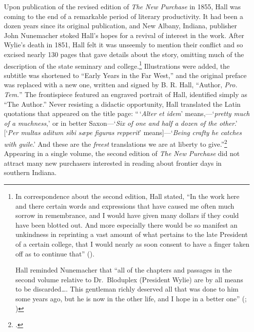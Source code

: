 \documentclass[
  american,
  letterpaper,
]{scrreprt}
\begin{document}
Upon publication of the revised edition of \emph{The New Purchase} in
1855, Hall was coming to the end of a remarkable period of literary
productivity. It had been a dozen years since its original publication,
and New Albany, Indiana, publisher John Nunemacher stoked Hall's hopes
for a revival of interest in the work. After Wylie's death in 1851, Hall
felt it was unseemly to mention their conflict and so excised nearly 130
pages that gave details about the story, omitting much of the
description of the state seminary and college.\footnote{In
  correspondence about the second edition, Hall stated, ``In the work
  here and there certain words and expressions that have caused me often
  much sorrow in remembrance, and I would have given many dollars if
  they could have been blotted out. And more especially there would be
  so manifest an unkindness in reprinting a vast amount of what pertains
  to the late President of a certain college, that I would nearly as
  soon consent to have a finger taken off as to continue that''
  ().

  Hall reminded Nunemacher that ``all of the chapters and passages in
  the second volume relative to Dr.~Bloduplex (President Wylie) are by
  all means to be discarded\ldots. This gentleman richly deserved all
  that was done to him some years ago, but he is now in the other life,
  and I hope in a better one'' (;
  )} Illustrations
were added, the subtitle was shortened to ``Early Years in the Far
West,'' and the original preface was replaced with a new one, written
and signed by B. R. Hall, ``Author, \emph{Pro. Tem.}'' The frontispiece
featured an engraved portrait of Hall, identified simply as ``The
Author.'' Never resisting a didactic opportunity, Hall translated the
Latin quotations that appeared on the title page: ``\,`\emph{Alter et
idem}' means,---`\emph{pretty much of a muchness},' or in better
Saxon---`\emph{Six of one and half a dozen of the other}.' {[}`\emph{Per
multas aditum sibi sæpe figuras repperit}' means{]}---`\emph{Being
crafty he catches with guile}.' And these are the \emph{freest}
translations we are at liberty to give.''\footnote{.} Appearing in a
single volume, the second edition of \emph{The New Purchase} did not
attract many new purchasers interested in reading about frontier days in
southern Indiana.
\end{document}
